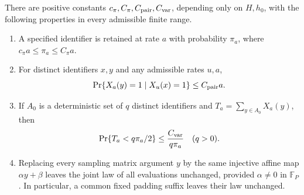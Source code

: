 \begin{lemma}\label{lem:env-ranks}
There are positive constants $c_\pi,C_\pi,C_{\rm pair},C_{\rm var}$,
depending only on $H,h_0$, with the following properties in every
admissible finite range.
\begin{enumerate}
\item A specified identifier is retained at rate $a$ with probability
$\pi_a$, where $c_\pi a\le\pi_a\le C_\pi a$.
\item For distinct identifiers $x,y$ and any admissible rates $u,a$,
\[
\Pr\{X_a(y)=1\mid X_u(x)=1\}\le C_{\rm pair}a.
\]
\item If $A_0$ is a deterministic set of $q$ distinct identifiers and
$T_a=\sum_{y\in A_0}X_a(y)$, then
\[
\Pr\{T_a<q\pi_a/2\}\le \frac{C_{\rm var}}{q\pi_a}
\quad(q>0).
\]
\item Replacing every sampling matrix argument $y$ by the same injective affine
map $\alpha y+\beta$ leaves the joint law of all evaluations unchanged,
provided $\alpha\ne0$ in $\mathbb F_P$. In particular, a common fixed
padding suffix leaves their law unchanged.
\end{enumerate}
\end{lemma}

